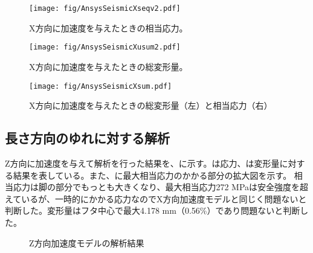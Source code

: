 \begin{figure}[htbp]
\begin{minipage}{0.47\textwidth}
\centering
\texttt{[image: fig/AnsysSeismicXseqv2.pdf]}
\caption[X方向に加速度を与えたときの相当応力]{X方向に加速度を与えたときの相当応力。}
\label{SEQVX}
\end{minipage}
\hfill
\begin{minipage}{0.47\textwidth}
\centering
\texttt{[image: fig/AnsysSeismicXusum2.pdf]}
\caption[X方向に加速度を与えたときの総変形量]{X方向に加速度を与えたときの総変形量。}
\label{USUMX}
\end{minipage}
\end{figure}
\fi%

\begin{figure}[htbp]
\centering
\texttt{[image: fig/AnsysSeismicXsum.pdf]}
\caption[X方向に加速度を与えたときの総変形量と相当応力]{X方向に加速度を与えたときの総変形量（左）と相当応力（右）}
\label{SeismicX}
\end{figure}


\subsection{長さ方向のゆれに対する解析}

Z方向に加速度を与えて解析を行った結果を、に示す。は応力、は変形量に対する結果を表している。また、に最大相当応力のかかる部分の拡大図を示す。
相当応力は脚の部分でもっとも大きくなり、最大相当応力272 MPaは安全強度を超えているが、一時的にかかる応力なのでX方向加速度モデルと同じく問題ないと判断した。変形量はフタ中心で最大4.178 mm（0.56\%）であり問題ないと判断した。

\begin{figure}[htbp]
  \begin{minipage}{0.47\textwidth}
  \end{minipage}
  \hfill
  \begin{minipage}{0.47\textwidth}
  \end{minipage}
    \caption{Z方向加速度モデルの解析結果}
  \label{Zmatome}
\end{figure}



